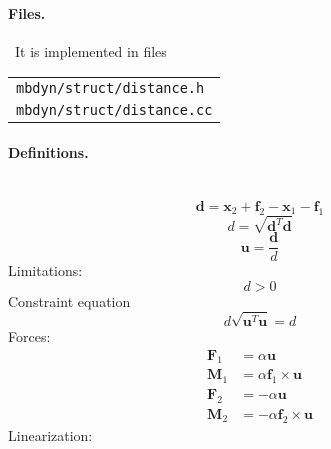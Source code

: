 \documentclass[10pt,dvips,fleqn,subeqn]{report}
\newcommand{\T}[1]{\bm{#1}}
\begin{document}
\paragraph{Files.} \
It is implemented in files

\begin{tabular}{l}
\texttt{mbdyn/struct/distance.h} \\
\texttt{mbdyn/struct/distance.cc}
\end{tabular}

\paragraph{Definitions.} \
\begin{equation}
	\T{d} = \T{x}_2 + \T{f}_2 - \T{x}_1 - \T{f}_1
\end{equation}
\begin{equation}
	d = \sqrt{\T{d}^T \T{d}}
\end{equation}
\begin{equation}
	\T{u} = \frac{\T{d}}{d}
\end{equation}
Limitations:
\begin{equation}
	d > 0
\end{equation}
Constraint equation 
\begin{equation}
	d \sqrt{\T{u}^T \T{u}} = d
\end{equation}
Forces:
\begin{subequations}
\begin{align}
	\T{F}_1 &= \alpha \T{u} \\
	\T{M}_1 &= \alpha \T{f}_1 \times \T{u} \\
	\T{F}_2 &= -\alpha \T{u} \\
	\T{M}_2 &= -\alpha \T{f}_2 \times \T{u}
\end{align}
\end{subequations}
Linearization:
\end{document}
